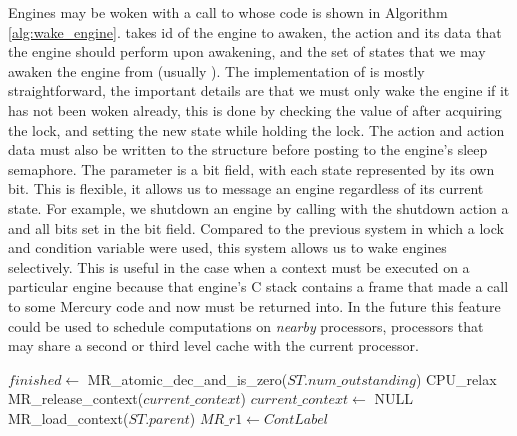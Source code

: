 Engines may be woken with a call to \wakeengine whose code is shown in
Algorithm \ref{alg:wake_engine}.
\wakeengine takes id of the engine to awaken,
the action and its data that the engine should perform upon awakening,
and the set of states that we may awaken the engine from (usually
).
The implementation of \wakeengine is mostly straightforward,
the important details are that we must only wake the engine if it has not
been woken already, this is done by checking the value of
 after acquiring the lock,
and setting the new state while holding the lock.
The action and action data must also be written to the
\enginesleepsync structure before posting to the engine's sleep
semaphore.
The parameter  is a bit field, with each state represented by
its own bit.
This is flexible, it allows us to message an engine regardless of its
current state.
For example,
we shutdown an engine by calling \wakeengine with the shutdown action a and
all bits set in the  bit field.
Compared to the previous system in which a lock and condition variable were
used,
this system allows us to wake engines selectively.
This is useful in the case when a context must be executed on a particular
engine because that engine's C stack contains a frame that made a call to
some Mercury code and now must be returned into.
In the future this feature could be used to schedule computations on
\emph{nearby} processors,
processors that may share a second or third level cache with the current
processor.

\begin{algorithm}[tbp]
\begin{algorithmic}[1]
  \State $finished \gets$ MR\_atomic\_dec\_and\_is\_zero($ST.num\_outstanding$)
    \Else
        \State CPU\_relax
      \EndWhile
      \State MR\_release\_context($current\_context$)
      \State $current\_context \gets$ NULL
      \State MR\_load\_context($ST.parent$)
    \EndIf
  \Else
      \State $MR\_r1 \gets ContLabel$
    \Else
    \EndIf
  \EndIf
\EndProcedure
\end{algorithmic}
\caption{\joinandcontinue}
\label{alg:join_and_continue_ws2}
\end{algorithm}


